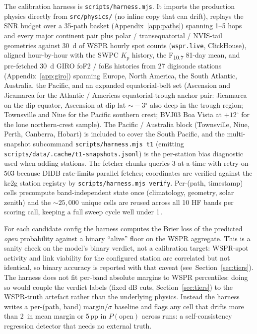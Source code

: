 \documentclass[11pt,a4paper]{article}
\newcommand{\SI}[2]{#1\,\text{#2}}
\newcommand{\dB}{\text{dB}}
\newcommand{\degree}{\ensuremath{{}^\circ}}
\begin{document}
The calibration harness is \texttt{scripts/harness.mjs}.
It imports the production physics directly from
\texttt{src/physics/} (no inline copy that can drift), replays the
SNR budget over a
35-path basket (Appendix~\ref{app:paths}) spanning 1--5 hops and
every major continent pair plus polar / transequatorial / NVIS-tail
geometries against
30~d of WSPR hourly spot counts (\texttt{wspr.live}, ClickHouse),
aligned hour-by-hour with the SWPC $K_p$ history, the
F\textsubscript{10.7} 81-day mean, and pre-fetched 30~d GIRO
foF2 / foEs histories from 27 digisonde stations
(Appendix~\ref{app:giro}) spanning Europe, North America, the South
Atlantic, Australia, the Pacific, and an expanded equatorial-belt
set (Ascension and Jicamarca for the Atlantic / Americas
equatorial-trough anchor pair: Jicamarca on the dip equator,
Ascension at dip lat ${\sim}\!-3\degree$ also deep in the trough
region; Townsville and Niue for the Pacific southern crest;
BVJ03 Boa Vista at $+12\degree$ for the lone northern-crest
sample).  The Pacific / Australia block (Townsville, Niue, Perth,
Canberra, Hobart) is included to cover the South Pacific, and the
multi-snapshot subcommand \texttt{scripts/harness.mjs t1} (emitting
\texttt{scripts/data/.cache/t1-snapshots.jsonl}) is the per-station
bias diagnostic used when adding stations.  The fetcher chunks
queries 3-at-a-time with retry-on-503 because DIDB rate-limits
parallel fetches; coordinates are verified against the kc2g
station registry by \texttt{scripts/harness.mjs verify}.  Per-(path,
timestamp) cells precompute band-independent state once
(climatology, geometry, solar zenith) and the ${\sim}25{,}000$
unique cells are reused across all 10 HF bands per scoring call,
keeping a full sweep cycle well under \SI{1}{s}.

For each candidate config the harness computes the Brier loss of the
predicted \emph{open} probability against a binary ``alive'' floor on
the WSPR aggregate.  This is a sanity check on the model's binary
verdict, not a calibration target: WSPR-spot activity and link
viability for the configured station are correlated but not
identical, so binary accuracy is reported with that caveat
(see~Section~\ref{sec:tiers}).  The harness does not fit
per-band absolute
margins to WSPR percentiles: doing so would couple the verdict
labels (fixed dB cuts, Section~\ref{sec:tiers}) to the
WSPR-truth artefact rather than the underlying physics.
Instead the harness writes a per-(path, band)
margin/$\sigma$ baseline and flags any cell that drifts more than
\SI{2}{\dB} in mean margin or 5\,pp in $P(\text{open})$ across
runs: a self-consistency regression detector that needs no external
truth.
\end{document}
